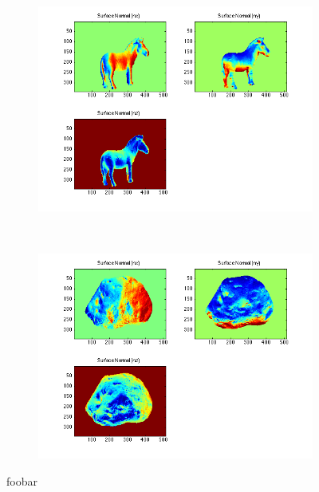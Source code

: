 \documentclass{paper}
\begin{document}
\begin{figure}[h!]
    \begin{subfigure}{0.45\textwidth}
        \includegraphics[width=\textwidth]{results/horse/horse_n_xyz}
    \end{subfigure}
    ~
    \begin{subfigure}{0.45\textwidth}
        \includegraphics[width=\textwidth]{results/rock/rock_n_xyz}
    \end{subfigure}
    
    \caption{foobar}
    \label{fig:normals_xyz}       
\end{figure}
\end{document}
